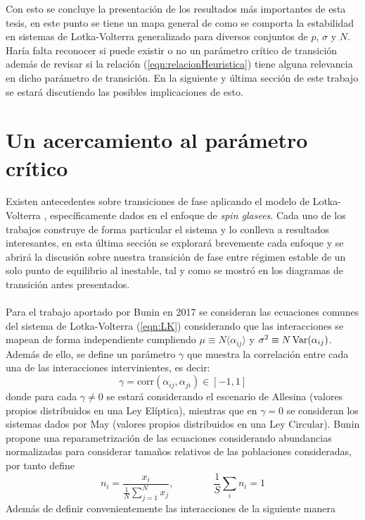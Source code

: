 Con esto se concluye la presentación de los resultados más importantes de esta tesis, en este punto se tiene un mapa general de como se comporta la estabilidad en sistemas de Lotka-Volterra generalizado para diversos conjuntos de $p$, $\sigma$ y $N$. Haría falta reconocer si puede existir o no un parámetro crítico de transición además de revisar si la relación (\ref{eqn:relacionHeuristica}) tiene alguna relevancia en dicho parámetro de transición. En la siguiente y última sección de este trabajo se estará discutiendo las posibles implicaciones de esto.
\newpage

\section{Un acercamiento al parámetro crítico}

Existen antecedentes sobre transiciones de fase aplicando el modelo de Lotka-Volterra \cite{bunin2017ecological, biroli2018marginally, altieri2021properties}, específicamente dados en el enfoque de \textit{spin glasees}. Cada uno de los trabajos construye de forma particular el sistema y lo conlleva a resultados interesantes, en esta última sección se explorará brevemente cada enfoque y se abrirá la discusión sobre nuestra transición de fase entre régimen estable de un solo punto de equilibrio al inestable, tal y como se mostró en los diagramas de transición antes presentados.
\\
\\
Para el trabajo aportado por Bunin en 2017 \cite{bunin2017ecological} se consideran las ecuaciones comunes del sistema de Lotka-Volterra (\ref{eqn:LK}) considerando que las interacciones se mapean de forma independiente cumpliendo $\mu\equiv N\langle\alpha_{ij}\rangle$ y $\sigma^2\equiv N\, \mathrm{Var}(\alpha_{ij})$. Además de ello, se define un parámetro $\gamma$ que muestra la correlación entre cada una de las interacciones intervinientes, es decir:
$$\gamma = \text{corr}(\alpha_{ij},\alpha_{ji})\in[-1,1]$$
donde para cada $\gamma\neq 0$ se estará considerando el escenario de Allesina (valores propios distribuidos en una Ley Elíptica), mientras que en $\gamma=0$ se consideran los sistemas dados por May (valores propios distribuidos en una Ley Circular). Bunin propone una reparametrización de las ecuaciones considerando abundancias normalizadas para considerar tamaños relativos de las poblaciones consideradas, por tanto define
$$n_i=\frac{x_i}{\frac{1}{N}\sum_{j=1}^N x_j},\qquad\qquad \frac{1}{S}\sum_i n_i=1$$
Además de definir convenientemente las interacciones de la siguiente manera
